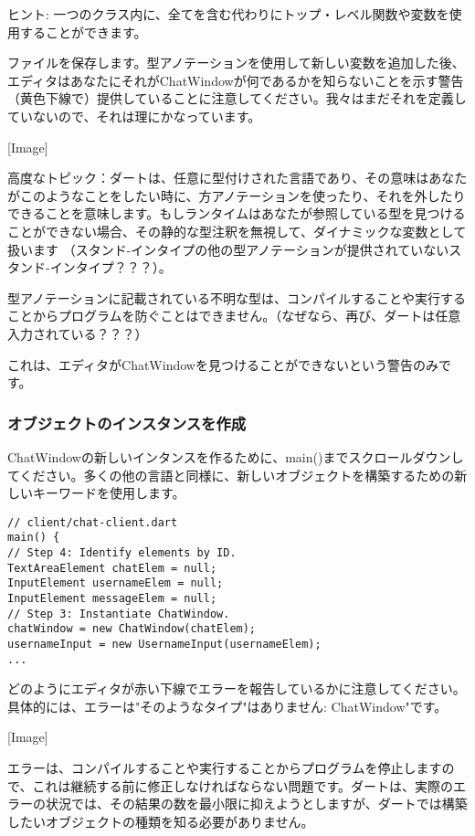 ヒント: 一つのクラス内に、全てを含む代わりにトップ・レベル関数や変数を使用することができます。

ファイルを保存します。型アノテーションを使用して新しい変数を追加した後、エディタはあなたにそれがChatWindowが何であるかを知らないことを示す警告（黄色下線で）提供していることに注意してください。我々はまだそれを定義していないので、それは理にかなっています。

[Image]

高度なトピック：ダートは、任意に型付けされた言語であり、その意味はあなたがこのようなことをしたい時に、方アノテーションを使ったり、それを外したりできることを意味します。もしランタイムはあなたが参照している型を見つけることができない場合、その静的な型注釈を無視して、ダイナミックな変数として扱います
（スタンド-インタイプの他の型アノテーションが提供されていないスタンド-インタイプ？？？）。

型アノテーションに記載されている不明な型は、コンパイルすることや実行することからプログラムを防ぐことはできません。（なぜなら、再び、ダートは任意入力されている？？？）

これは、エディタがChatWindowを見つけることができないという警告のみです。

\subsubsection{オブジェクトのインスタンスを作成}

ChatWindowの新しいインタンスを作るために、main()までスクロールダウンしてください。多くの他の言語と同様に、新しいオブジェクトを構築するための新しいキーワードを使用します。

\begin{verbatim}
// client/chat-client.dart
main() {
// Step 4: Identify elements by ID.
TextAreaElement chatElem = null;
InputElement usernameElem = null;
InputElement messageElem = null;
// Step 3: Instantiate ChatWindow.
chatWindow = new ChatWindow(chatElem);
usernameInput = new UsernameInput(usernameElem);
...
\end{verbatim}

どのようにエディタが赤い下線でエラーを報告しているかに注意してください。具体的には、エラーは"そのようなタイプ"はありません: ChatWindow"です。

[Image]

エラーは、コンパイルすることや実行することからプログラムを停止しますので、これは継続する前に修正しなければならない問題です。ダートは、実際のエラーの状況では、その結果の数を最小限に抑えようとしますが、ダートでは構築したいオブジェクトの種類を知る必要がありません。

